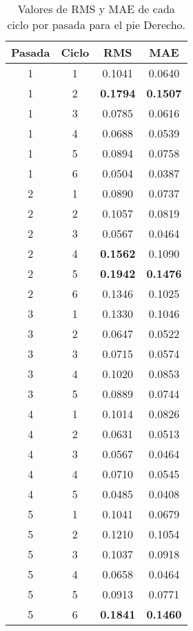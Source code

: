 \begin{table}[H]
\centering
\renewcommand{\arraystretch}{1.2}
\begin{tabular}{|c|c|c|c|}
\hline
\textbf{Pasada} & \textbf{Ciclo} & \textbf{RMS} & \textbf{MAE} \\
\hline
1 & 1 & 0.1041 & 0.0640 \\
\hline
1 & 2 & \textbf{0.1794} & \textbf{0.1507} \\
\hline
1 & 3 & 0.0785 & 0.0616 \\
\hline
1 & 4 & 0.0688 & 0.0539 \\
\hline
1 & 5 & 0.0894 & 0.0758 \\
\hline
1 & 6 & 0.0504 & 0.0387 \\
\hline
2 & 1 & 0.0890 & 0.0737 \\
\hline
2 & 2 & 0.1057 & 0.0819 \\
\hline
2 & 3 & 0.0567 & 0.0464 \\
\hline
2 & 4 & \textbf{0.1562} & 0.1090 \\
\hline
2 & 5 & \textbf{0.1942} & \textbf{0.1476} \\
\hline
2 & 6 & 0.1346 & 0.1025 \\
\hline
3 & 1 & 0.1330 & 0.1046 \\
\hline
3 & 2 & 0.0647 & 0.0522 \\
\hline
3 & 3 & 0.0715 & 0.0574 \\
\hline
3 & 4 & 0.1020 & 0.0853 \\
\hline
3 & 5 & 0.0889 & 0.0744 \\
\hline
4 & 1 & 0.1014 & 0.0826 \\
\hline
4 & 2 & 0.0631 & 0.0513 \\
\hline
4 & 3 & 0.0567 & 0.0464 \\
\hline
4 & 4 & 0.0710 & 0.0545 \\
\hline
4 & 5 & 0.0485 & 0.0408 \\
\hline
5 & 1 & 0.1041 & 0.0679 \\
\hline
5 & 2 & 0.1210 & 0.1054 \\
\hline
5 & 3 & 0.1037 & 0.0918 \\
\hline
5 & 4 & 0.0658 & 0.0464 \\
\hline
5 & 5 & 0.0913 & 0.0771 \\
\hline
5 & 6 & \textbf{0.1841} & \textbf{0.1460} \\
\hline
\end{tabular}
\caption{Valores de RMS y MAE de cada ciclo por pasada para el pie Derecho.}
\label{tab:rms_mae_pie_derecho}
\end{table}
